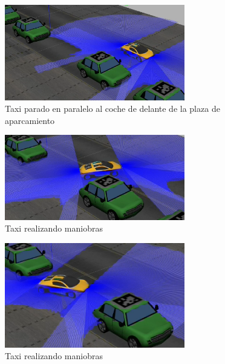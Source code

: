 \begin{figure}[H]
  \begin{center}
    \includegraphics[width=0.7\textwidth]{figures/Autopark/Experimento1_2.png}
		\caption{Taxi parado en paralelo al coche de delante de la plaza de aparcamiento}
		\label{fig.Experimento1_2}
		\end{center}
\end{figure}

\begin{figure}[H]
  \begin{center}
    \includegraphics[width=0.7\textwidth]{figures/Autopark/Experimento1_3.png}
		\caption{Taxi realizando maniobras}
		\label{fig.Experimento1_3}
		\end{center}
\end{figure}

\begin{figure}[H]
  \begin{center}
    \includegraphics[width=0.7\textwidth]{figures/Autopark/Experimento1_4.png}
		\caption{Taxi realizando maniobras}
		\label{fig.Experimento1_4}
		\end{center}
\end{figure}

